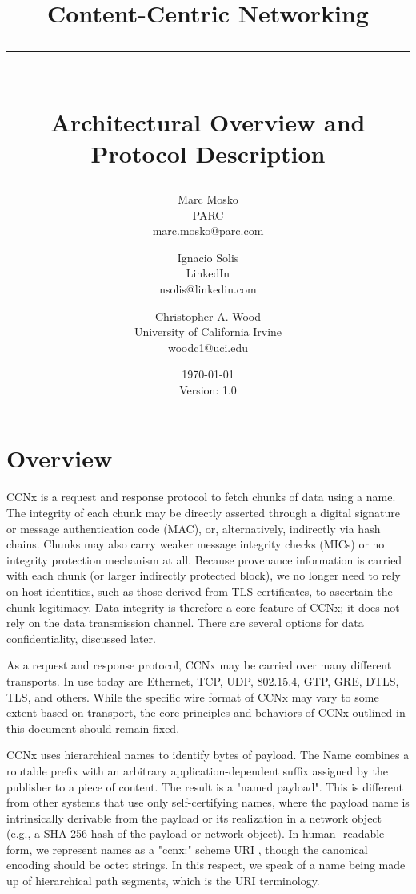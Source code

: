 \documentclass[12pt]{article}
\newcommand{\HRule}[1]{\rule{\linewidth}{#1}}
\begin{document}
\title{ \LARGE \textbf{Content-Centric Networking}
        \HRule{2pt} \\ [0.5cm]
        \large Architectural Overview and Protocol Description}

\date{\today \\ Version: 1.0}

\author{Marc Mosko\\
        PARC \\
        marc.mosko@parc.com
        \and
        Ignacio Solis \\
        LinkedIn \\
        nsolis@linkedin.com
        \and
        Christopher A. Wood \\
        University of California Irvine \\
        woodc1@uci.edu
}

\maketitle
\tableofcontents
\newpage

\section{Overview}
CCNx is a request and response protocol to fetch chunks of data using
a name.  The integrity of each chunk may be directly asserted through
a digital signature or message authentication code (MAC), or,
alternatively, indirectly via hash chains.  Chunks may also carry
weaker message integrity checks (MICs) or no integrity protection
mechanism at all.  Because provenance information is carried with
each chunk (or larger indirectly protected block), we no longer need
to rely on host identities, such as those derived from TLS
certificates, to ascertain the chunk legitimacy.  Data integrity is
therefore a core feature of CCNx; it does not rely on the data
transmission channel.  There are several options for data
confidentiality, discussed later.

As a request and response protocol, CCNx may be carried over many
different transports.  In use today are Ethernet, TCP, UDP, 802.15.4,
GTP, GRE, DTLS, TLS, and others.  While the specific wire format of
CCNx may vary to some extent based on transport, the core principles
and behaviors of CCNx outlined in this document should remain fixed.

CCNx uses hierarchical names to identify bytes of payload.  The Name
combines a routable prefix with an arbitrary application-dependent
suffix assigned by the publisher to a piece of content.  The result
is a "named payload".  This is different from other systems that use
only self-certifying names, where the payload name is intrinsically
derivable from the payload or its realization in a network object
(e.g., a SHA-256 hash of the payload or network object).  In human-
readable form, we represent names as a "ccnx:" scheme URI
\cite{berners2014rfc}, though the canonical encoding should be octet strings.  In
this respect, we speak of a name being made up of hierarchical path
segments, which is the URI terminology.
\end{document}
